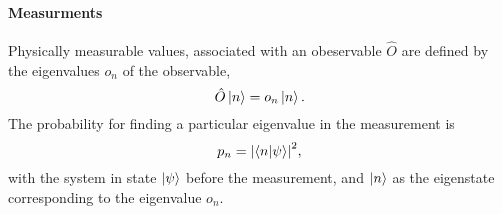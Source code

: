     \paragraph{Measurments}
    Physically measurable values, associated with an obeservable $\hat{O}$ are defined by the 
    eigenvalues $o_n$ of the observable,
    \begin{equation}
        \hat{O}\ket{n} = o_n\ket{n}.
    \end{equation}
    The probability for finding a particular eigenvalue in the measurement is
    \begin{equation}
        p_n = \abs{\braket{n}{\psi}}^2,
    \end{equation}
    with the system in state $\ket{\psi}$ before the measurement, and $\ket{n}$ as the 
    eigenstate corresponding to the eigenvalue $o_n$.
